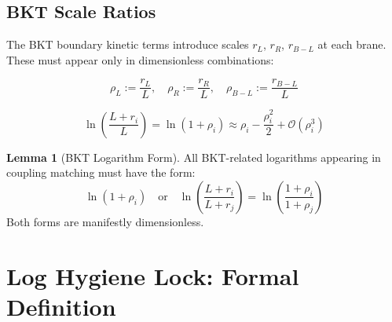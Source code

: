 \documentclass[11pt,a4paper]{article}
\theoremstyle{definition}
\newtheorem{lemma}[theorem]{Lemma}
\begin{document}
\subsection{BKT Scale Ratios}
\label{subsec:bkt_ratios}

The BKT boundary kinetic terms introduce scales $r_L$, $r_R$, $r_{B-L}$ at each brane.
These must appear only in dimensionless combinations:

\begin{equation}
\label{eq:rho_L_def}
\rho_L := \frac{r_L}{L}, \quad \rho_R := \frac{r_R}{L}, \quad \rho_{B-L} := \frac{r_{B-L}}{L}
\end{equation}

\begin{equation}
\label{eq:log_bkt_good}
\ln\left(\frac{L + r_i}{L}\right) = \ln(1 + \rho_i) \approx \rho_i - \frac{\rho_i^2}{2} + \mathcal{O}(\rho_i^3)
\end{equation}

\begin{lemma}[BKT Logarithm Form]
\label{lem:bkt_log}
All BKT-related logarithms appearing in coupling matching must have the form:
\begin{equation}
\label{eq:bkt_log_form}
\ln(1 + \rho_i) \quad \text{or} \quad \ln\left(\frac{L + r_i}{L + r_j}\right) = \ln\left(\frac{1 + \rho_i}{1 + \rho_j}\right)
\end{equation}
Both forms are manifestly dimensionless.
\end{lemma}

\section{Log Hygiene Lock: Formal Definition}
\label{sec:log_hygiene}
\end{document}
